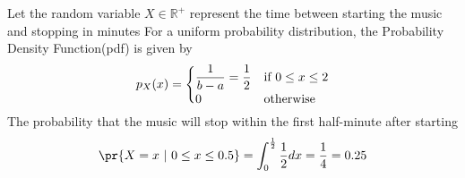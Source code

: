 Let the random variable  $X\in\mathbb{R^+} $ represent the time between starting the music and stopping in minutes
For a uniform probability distribution, the Probability Density Function(pdf) is given by
\begin{align}
  p_{X}(x) =
  \begin{cases}
  \dfrac{1}{b-a} = \dfrac{1}{2} & \text{if $0 \leq x \leq 2$}\\ \vspace{-0.1cm}
  0 & \text{otherwise} 
  \end{cases}
\end{align}
The probability that the music will stop within the first half-minute after starting
\begin{align}
    \pr{X=x \,\,|\,\, 0 \leq x \leq 0.5} = \int_0^{\frac{1}{2}} \frac{1}{2} dx = \frac{1}{4} =0.25
\end{align}